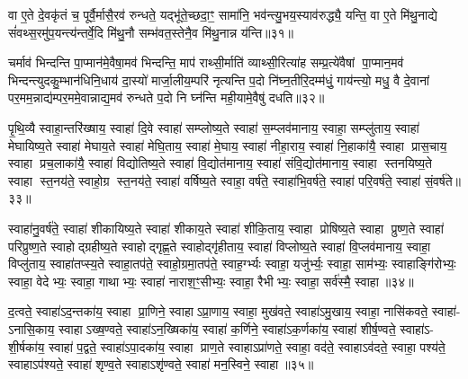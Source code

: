 वा ए॒ते दे॒वकृ॑तं च॒ पूर्वै॒र्मासै॒रव॑ रुन्धते॒ यद्भू॑ते॒च्छदा॒ꣳ॒ सामा॑नि॒ भव॑न्त्यु॒भय॒स्याव॑रुद्ध्यै॒ यन्ति॒ वा ए॒ते मि॑थु॒नाद्ये सं॑वथ्स॒रमु॑प॒यन्त्य॑न्तर्वे॒दि मि॑थु॒नौ सम्भ॑वत॒स्तेनै॒व मि॑थु॒नान्न य॑न्ति॥३१॥

{\anuvakamend[{व्यृ॑द्ध॒मख्षो॑धुका॒स्ता समां प्र॒जाः प॑र॒मामे॒व च॑ त्रि॒ꣳ॒शच्च॑॥९॥}]}

चर्माव॑ भिन्दन्ति पा॒प्मान॑मे॒वैषा॒मव॑ भिन्दन्ति॒ माप॑ राथ्सी॒र्माति॑ व्याथ्सी॒रित्या॑ह सम्प्र॒त्ये॑वैषां पा॒प्मान॒मव॑ भिन्दन्त्युदकु॒म्भान॑धिनि॒धाय॑ दा॒स्यो॑ मार्जा॒लीय॒म्परि॑ नृत्यन्ति प॒दो नि॑घ्न॒तीरि॒दम्म॑धुं॒ गाय॑न्त्यो॒ मधु॒ वै दे॒वानां पर॒मम॒न्नाद्य॑म्पर॒ममे॒वान्नाद्य॒मव॑ रुन्धते प॒दो नि घ्न॑न्ति मही॒यामे॒वैषु॑ दधति॥३२॥

{\anuvakamend[{चर्मैका॒न्नप॑ञ्चा॒शत्॥10॥}]}

पृ॒थि॒व्यै स्वाहा॒न्तरि॑ख्षाय॒ स्वाहा॑ दि॒वे स्वाहा॑ सम्प्लोष्य॒ते स्वाहा॑ स॒म्प्लव॑मानाय॒ स्वाहा॒ सम्प्लु॑ताय॒ स्वाहा॑ मेघायिष्य॒ते स्वाहा॑ मेघाय॒ते स्वाहा॑ मेघि॒ताय॒ स्वाहा॑ मे॒घाय॒ स्वाहा॑ नीहा॒राय॒ स्वाहा॑ नि॒हाका॑यै॒ स्वाहा प्रास॒चाय॒ स्वाहा प्रच॒लाका॑यै॒ स्वाहा॑ विद्योतिष्य॒ते स्वाहा॑ वि॒द्योत॑मानाय॒ स्वाहा॑ संवि॒द्योत॑मानाय॒ स्वाहा स्तनयिष्य॒ते स्वाहा स्त॒नय॑ते॒ स्वाहो॒ग्र स्त॒नय॑ते॒ स्वाहा॑ वर्\mbox{}षिष्य॒ते स्वाहा॒ वर्\mbox{}ष॑ते॒ स्वाहा॑भि॒वर्\mbox{}ष॑ते॒ स्वाहा॑ परि॒वर्\mbox{}ष॑ते॒ स्वाहा॑ सं॒वर्\mbox{}ष॑ते॥३३॥

स्वाहा॑नु॒वर्\mbox{}ष॑ते॒ स्वाहा॑ शीकायिष्य॒ते स्वाहा॑ शीकाय॒ते स्वाहा॑ शीकि॒ताय॒ स्वाहा प्रोषिष्य॒ते स्वाहा प्रुष्ण॒ते स्वाहा॑ परिप्रुष्ण॒ते स्वाहोद्ग्रहीष्य॒ते स्वाहोद्गृह्ण॒ते स्वाहोद्गृ॑हीताय॒ स्वाहा॑ विप्लोष्य॒ते स्वाहा॑ वि॒प्लव॑मानाय॒ स्वाहा॒ विप्लु॑ताय॒ स्वाहा॑तप्स्य॒ते स्वाहा॒तप॑ते॒ स्वाहो॒ग्रमा॒तप॑ते॒ स्वाह॒र्ग्भ्यः स्वाहा॒ यजु॑र्भ्यः॒ स्वाहा॒ साम॑भ्यः॒ स्वाहाङ्गि॑रोभ्यः॒ स्वाहा॒ वेदेभ्यः॒ स्वाहा॒ गाथाभ्यः॒ स्वाहा॑ नाराश॒ꣳ॒सीभ्यः॒ स्वाहा॒ रैभीभ्यः॒ स्वाहा॒ सर्व॑स्मै॒ स्वाहा॥३४॥

{\anuvakamend[{सं॒ वर्\mbox{}ष॑ते॒ रैभीभ्यः॒ स्वाहा॒ द्वे च॑॥11॥}]}

द॒त्वते॒ स्वाहा॑ऽद॒न्तका॑य॒ स्वाहा प्रा॒णिने॒ स्वाहाऽप्रा॒णाय॒ स्वाहा॒ मुख॑वते॒ स्वाहा॑ऽमु॒खाय॒ स्वाहा॒ नासि॑कवते॒ स्वाहा॑- ऽनासि॒काय॒ स्वाहाऽख्ष॒ण्वते॒ स्वाहा॑ऽन॒ख्षिका॑य॒ स्वाहा॑ क॒र्णिने॒ स्वाहा॑ऽक॒र्णका॑य॒ स्वाहा॑ शीर्\mbox{}ष॒ण्वते॒ स्वाहा॑ऽ- शी॒र्\mbox{}षका॑य॒ स्वाहा॑ प॒द्वते॒ स्वाहा॑ऽपा॒दका॑य॒ स्वाहा प्राण॒ते स्वाहाऽप्रा॑णते॒ स्वाहा॒ वद॑ते॒ स्वाहाऽव॑दते॒ स्वाहा॒ पश्य॑ते॒ स्वाहाऽप॑श्यते॒ स्वाहा॑ शृण्व॒ते स्वाहाऽशृ॑ण्वते॒ स्वाहा॑ मन॒स्विने॒ स्वाहा॥३५॥


